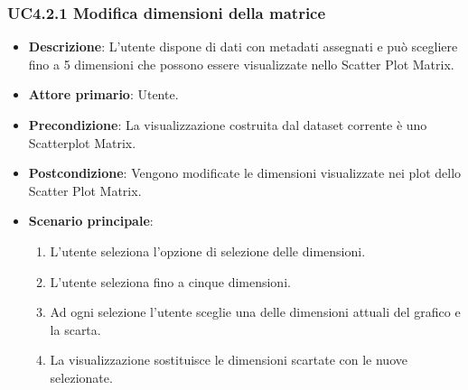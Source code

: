\subsubsection{UC4.2.1 Modifica dimensioni della matrice}
\label{ssub:uc4.2.1}
\begin{itemize}
    \item \textbf{Descrizione}:     L’utente dispone di dati con metadati assegnati e può 
                                    scegliere fino a 5 dimensioni che possono essere visualizzate nello Scatter Plot 
                                    Matrix.
	
    \item \textbf{Attore primario}: Utente.
    
    \item \textbf{Precondizione}:   La visualizzazione costruita dal dataset corrente è uno Scatterplot Matrix.
    \item \textbf{Postcondizione}:  Vengono modificate le dimensioni visualizzate nei plot dello Scatter Plot Matrix.

	\item \textbf{Scenario principale}:
        \begin{enumerate}
            \item   L'utente seleziona l'opzione di selezione delle dimensioni.
            \item   L'utente seleziona fino a cinque dimensioni. 
           
            \item   Ad ogni selezione l'utente
                    sceglie una delle dimensioni attuali del grafico e la scarta.
           
            \item   La visualizzazione sostituisce le dimensioni scartate con le nuove selezionate.
        \end{enumerate}
\end{itemize}

